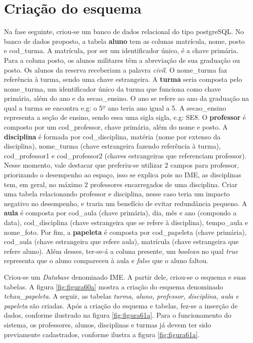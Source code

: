 \section{Criação do esquema}
Na fase seguinte, criou-se um banco de dados relacional do tipo postgreSQL. No banco de dados proposto, a tabela \textbf{aluno} tem as colunas matrícula, nome, posto e cod\_turma. A matrícula, por ser um identificador único, é a chave primária. Para a coluna posto, os alunos militares têm a abreviação de sua graduação ou posto. Os alunos da reserva receberiam a palavra \textit{civil}. O nome\_turma faz referência à turma, sendo uma chave estrangeira. A \textbf{turma} seria composta pelo nome\_turma, um identificador único da turma que funciona como chave primária, além do ano e da secao\_ensino. O ano se refere ao ano da graduação na qual a turma se encontra e.g: o 5º ano teria ano igual a 5. A secao\_ensino representa a seção de ensino, sendo essa uma sigla sigla, e.g: SE8. O \textbf{professor} é composto por um cod\_professor, chave primária, além do nome e posto. A \textbf{disciplina} é formada por cod\_disciplina, matéria (nome por extenso da disciplina), nome\_turma (chave estrangeira fazendo referência à turma), cod\_professor1 e cod\_professor2 (chaves estrangeiras que referenciam  professor). Nesse momento, vale destacar que preferiu-se utilizar 2 campos para professor, priorizando o desempenho ao espaço, isso se explica pois no IME, as disciplinas tem, em geral, no máximo 2 professores encarregados de uma disciplina. Criar uma tabela relacionando professor e disciplina, nesse caso teria um impacto negativo no desempenho, e traria um benefício de evitar redundância pequeno. A \textbf{aula} é composta por cod\_aula (chave primária), dia, mês e ano (compondo a data), cod\_disciplina (chave estrangeira que se refere à disciplina), tempo\_aula e nome\_foto. Por fim, a \textbf{papeleta} é composta por cod\_papeleta (chave primária), cod\_aula (chave estrangeira que refere aula), matrícula (chave estrangeira que refere aluno). Além desses, ter-se-á a coluna presente, um \textit{boolean} no qual  \textit{true} representa que o aluno compareceu à aula e  \textit{false} que o aluno faltou.

Criou-se um \textit{Database} denominado IME. A partir dele, criou-se o esquema e suas tabelas. A figura \ref{fig:figura60a} mostra a criação do esquema denominado \textit{tchau\_papeleta}. A seguir, as tabelas \textit{turma, aluno, professor, disciplina, aula e papeleta} são criadas. Após a criação do esquema e tabelas, fez-se a inserção de dados, conforme ilustrado na figura \ref{fig:figura61a}. Para o funcionamento do sistema, os professores, alunos, disciplinas e turmas já devem ter sido previamente cadastrados, conforme ilustra a figura \ref{fig:figura61a}.  

